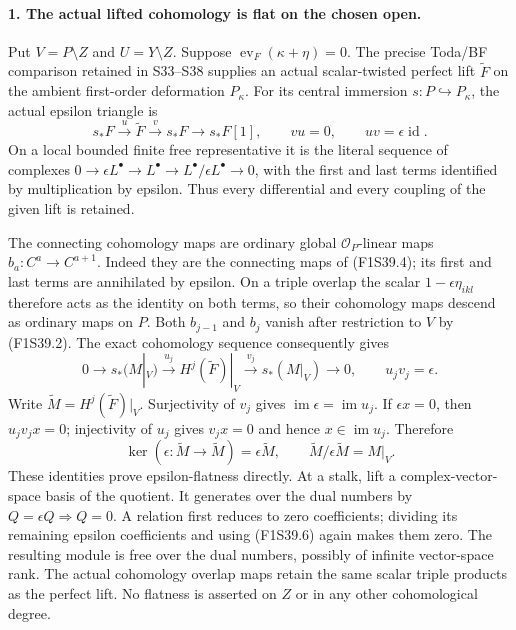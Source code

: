 \paragraph{1. The actual lifted cohomology is flat on the chosen open.}
Put $V=P\setminus Z$ and $U=Y\setminus Z$.
Suppose $\operatorname{ev}_F(\kappa+\eta)=0$.
The precise Toda/BF comparison retained in
S33--S38 supplies an actual scalar-twisted
perfect lift $\widetilde F$ on the ambient
first-order deformation $P_\kappa$.
For its central immersion $s:P\hookrightarrow
P_\kappa$, the actual epsilon triangle is
\[
 s_*F\xrightarrow{u}\widetilde F
       \xrightarrow{v}s_*F\longrightarrow s_*F[1],
 \qquad vu=0,\qquad uv=\epsilon\operatorname{id}.
 \tag{F1S39.4}
\]
On a local bounded finite free representative it
is the literal sequence of complexes
$0\to\epsilon L^\bullet\to L^\bullet
\to L^\bullet/\epsilon L^\bullet\to0$,
with the first and last terms identified by
multiplication by epsilon. Thus every differential
and every coupling of the given lift is retained.

The connecting cohomology maps are ordinary
global $\mathcal O_P$-linear maps
$b_a:C^a\to C^{a+1}$. Indeed they are the
connecting maps of (F1S39.4); its first and last
terms are annihilated by epsilon. On a triple
overlap the scalar $1-\epsilon\eta_{ikl}$
therefore acts as the identity on both terms,
so their cohomology maps descend as ordinary
maps on $P$. Both $b_{j-1}$ and $b_j$ vanish
after restriction to $V$ by (F1S39.2).
The exact cohomology sequence consequently gives
\[
 0\longrightarrow s_*(M|_V)\xrightarrow{u_j}
 H^j(\widetilde F)|_V\xrightarrow{v_j}
 s_*(M|_V)\longrightarrow0,
 \qquad u_jv_j=\epsilon.
 \tag{F1S39.5}
\]
Write $\widetilde M=H^j(\widetilde F)|_V$.
Surjectivity of $v_j$ gives
$\operatorname{im}\epsilon=\operatorname{im}u_j$.
If $\epsilon x=0$, then $u_jv_jx=0$;
injectivity of $u_j$ gives $v_jx=0$ and hence
$x\in\operatorname{im}u_j$. Therefore
\[
 \ker(\epsilon:\widetilde M\to\widetilde M)
       =\epsilon\widetilde M,
 \qquad \widetilde M/\epsilon\widetilde M=M|_V.
 \tag{F1S39.6}
\]
These identities prove epsilon-flatness directly.
At a stalk, lift a complex-vector-space basis of
the quotient. It generates over the dual numbers
by $Q=\epsilon Q\Rightarrow Q=0$.
A relation first reduces to zero coefficients;
dividing its remaining epsilon coefficients and
using (F1S39.6) again makes them zero.
The resulting module is free over the dual
numbers, possibly of infinite vector-space rank.
The actual cohomology overlap maps retain the
same scalar triple products as the perfect lift.
No flatness is asserted on $Z$ or in any other
cohomological degree.

